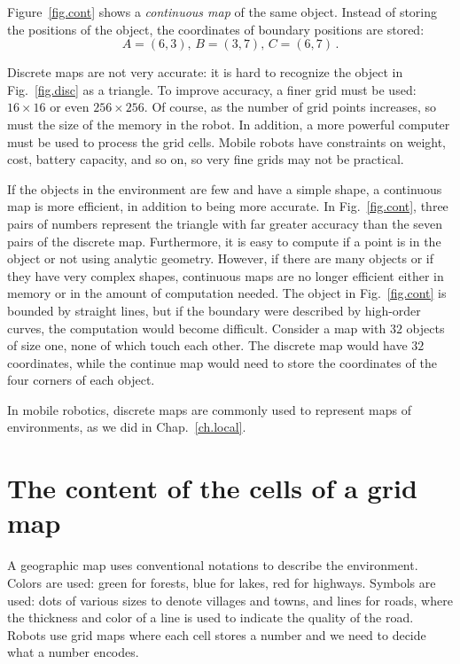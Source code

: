 Figure~\ref{fig.cont} shows a \emph{continuous map}\label{map!continuous} of the same object. Instead of storing the positions of the object, the coordinates of boundary positions are stored:
\[A = (6,3),\, B = (3,7),\, C = (6,7)\,.
\]

Discrete maps are not very accurate: it is hard to recognize the object in Fig.~\ref{fig.disc} as a triangle. To improve accuracy, a finer grid must be used: $16\times 16$ or even $256\times 256$. Of course, as the number of grid points increases, so must the size of the memory in the robot. In addition, a more powerful computer must be used to process the grid cells. Mobile robots have constraints on weight, cost, battery capacity, and so on, so very fine grids may not be practical. 

If the objects in the environment are few and have a simple shape, a continuous map is more efficient, in addition to being more accurate. In Fig.~\ref{fig.cont}, three pairs of numbers represent the triangle with far greater accuracy than the seven pairs of the discrete map. Furthermore, it is easy to compute if a point is in the object or not using analytic geometry. However, if there are many objects or if they have very complex shapes, continuous maps are no longer efficient either in memory or in the amount of computation needed. The object in Fig.~\ref{fig.cont} is bounded by straight lines, but if the boundary were described by high-order curves, the computation would become difficult. Consider a map with $32$ objects of size one, none of which touch each other. The discrete map would have $32$ coordinates, while the continue map would need to store the coordinates of the four corners of each object.

In mobile robotics, discrete maps are commonly used to represent maps of environments, as we did in Chap.~\ref{ch.local}.

\section{The content of the cells of a grid map}\label{s.grids}

A geographic map uses conventional notations to describe the environment. Colors are used: green for forests, blue for lakes, red for highways. Symbols are used: dots of various sizes to denote villages and towns, and lines for roads, where the thickness and color of a line is used to indicate the quality of the road. Robots use grid maps where each cell stores a number and we need to decide what a number encodes.

